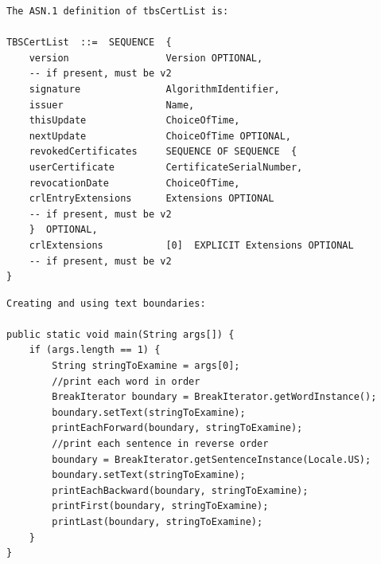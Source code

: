 \begin{lstlisting}[label=invalid-caveat-2,caption={An example of a caveat sentence extracted from the \lstinline{java.security.cert.X509CRL} documentation explaining the structure of a \lstinline{TBSCertList} object.},float,frame=tb,numbers=none,language=None,linebackgroundcolor={\lstcolorlines{3,4,5,6,7,8,9,10,11,12,13,14,15,16,17}}]
The ASN.1 definition of tbsCertList is:

TBSCertList  ::=  SEQUENCE  {
	version                 Version OPTIONAL,
	-- if present, must be v2
	signature               AlgorithmIdentifier,
	issuer                  Name,
	thisUpdate              ChoiceOfTime,
	nextUpdate              ChoiceOfTime OPTIONAL,
	revokedCertificates     SEQUENCE OF SEQUENCE  {
	userCertificate         CertificateSerialNumber,
	revocationDate          ChoiceOfTime,
	crlEntryExtensions      Extensions OPTIONAL
	-- if present, must be v2
	}  OPTIONAL,
	crlExtensions           [0]  EXPLICIT Extensions OPTIONAL
	-- if present, must be v2
}
\end{lstlisting}

\begin{lstlisting}[label=invalid-caveat-3,caption={An example of a caveat sentence extracted from the \lstinline{java.text.BreakIterator} documentation that contains some sample code.},float,frame=tb,numbers=none,language=None,linebackgroundcolor={\lstcolorlines{3,4,5,6,7,8,9,10,11,12,13,14,15,16,17}}]
Creating and using text boundaries:

public static void main(String args[]) {
	if (args.length == 1) {
		String stringToExamine = args[0];
		//print each word in order
		BreakIterator boundary = BreakIterator.getWordInstance();
		boundary.setText(stringToExamine);
		printEachForward(boundary, stringToExamine);
		//print each sentence in reverse order
		boundary = BreakIterator.getSentenceInstance(Locale.US);
		boundary.setText(stringToExamine);
		printEachBackward(boundary, stringToExamine);
		printFirst(boundary, stringToExamine);
		printLast(boundary, stringToExamine);
	}
}
\end{lstlisting}

